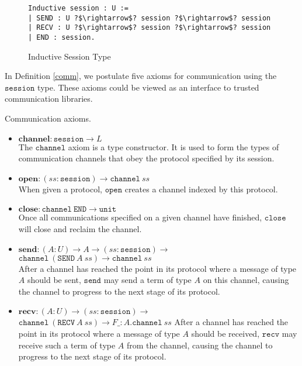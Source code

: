 \documentclass[sigplan,screen,review,anonymous]{acmart}
\newcommand{\unit}{\texttt{unit}}
\newcommand{\session}{\texttt{session}}
\newcommand{\channel}{\texttt{channel}}
\newcommand{\open}{\texttt{open}}
\newcommand{\close}{\texttt{close}}
\newcommand{\send}{\texttt{send}}
\newcommand{\recv}{\texttt{recv}}
\newcommand{\SEND}{\texttt{SEND}}
\newcommand{\RECV}{\texttt{RECV}}
\newcommand{\END}{\texttt{END}}
\begin{document}
\begin{figure}[h]
  \caption{Inductive Session Type}
  \begin{verbatim}
Inductive session : U :=
| SEND : U ?$\rightarrow$? session ?$\rightarrow$? session
| RECV : U ?$\rightarrow$? session ?$\rightarrow$? session
| END : session.
  \end{verbatim}
  \label{session}
  \Description{}
\end{figure}

In Definition \ref{comm}, we postulate five axioms for communication using the $\session$ type. These axioms could be viewed as an interface to trusted communication libraries.

\begin{definition}
  Communication axioms.
  \begin{itemize}
    \item $\textbf{channel} : \session \rightarrow L$ \\
          The $\channel$ axiom is a type constructor. It is used to form the types of communication channels that obey the protocol specified by its session.
    \item $\textbf{open} : (ss : \session) \rightarrow \channel\ ss$ \\
          When given a protocol, $\open$ creates a channel indexed by this protocol.
    \item $\textbf{close} : \channel\ \END \rightarrow \unit$ \\
          Once all communications specified on a given channel have finished, $\close$ will close and reclaim the channel.
    \item $\textbf{send} : (A : U) \rightarrow A \rightarrow (ss : \session) \rightarrow$ \\
          \phantom{send : (A :)}
          $\channel\ (\SEND\ A\ ss) \rightarrow \channel\ ss$ \\
          After a channel has reached the point in its protocol where a message of type $A$ should be sent, $\send$ may send a term of type $A$ on this channel, causing the channel to progress to the next stage of its protocol.
    \item $\textbf{recv} : (A : U) \rightarrow (ss : \session) \rightarrow $ \\
          \phantom{recv : (A :)}
          $\channel\ (\RECV\ A\ ss) \rightarrow F \_:A.\channel\ ss$
          After a channel has reached the point in its protocol where a message of type $A$ should be received, $\recv$ may receive such a term of type $A$ from the channel, causing the channel to progress to the next stage of its protocol.
  \end{itemize}
  \label{comm}
\end{definition}
\end{document}
